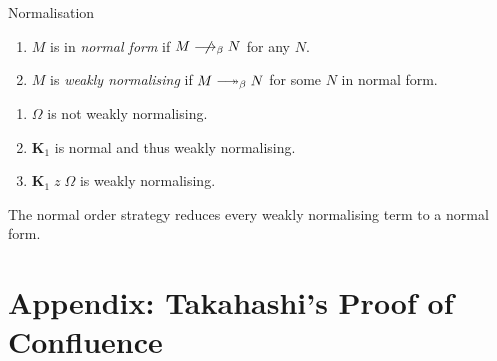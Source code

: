 \begin{frame}{Normalisation}
\begin{definition}
  \begin{enumerate}
    \item $M$ is in \emph{normal form} if $M \notonereduce N$ for any $N$. 
    \item $M$ is \emph{weakly normalising} if $M \reduce N$ for some $N$ in
      normal form.
  \end{enumerate}
\end{definition}
%
  \begin{enumerate}
    \item $\Omega$ is not weakly normalising.
    \item $\mathbf{K}_1$ is normal and thus weakly normalising.
    \item $\mathbf{K}_1\;z\; \Omega$ is weakly normalising.
  \end{enumerate}

\begin{theorem}
  The normal order strategy reduces every weakly
  normalising term to a normal form.
\end{theorem}

\end{frame}
%
%



\section{Appendix: Takahashi's Proof of Confluence}

